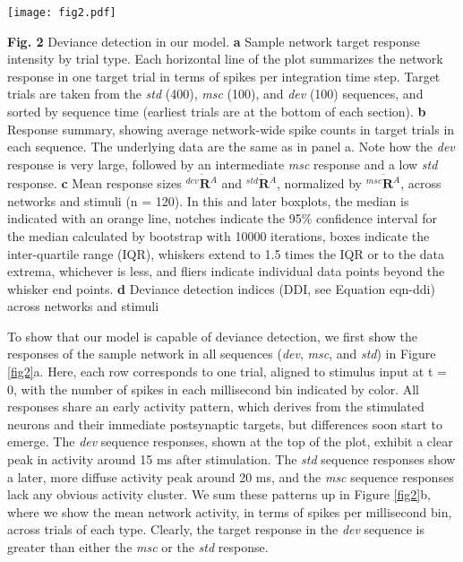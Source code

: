\documentclass[pdflatex,referee,iicol,sn-basic]{sn-jnl}
\newcommand{\dev}{\textit{dev}}
\newcommand{\msc}{\textit{msc}}
\newcommand{\std}{\textit{std}}
\renewcommand{\R}[3][]{{}^{#1}_{}\mathbf{R}^{#2}_{#3}}
\newcommand{\mean}[1]{\overline{#1}}
\newcommand{\refpanel}[2]{Figure \ref{fig#1}\lowercase{#2}}
\begin{document}
\begin{figure*}%
    \centering
    \texttt{[image: fig2.pdf]}
    \caption{}
    \label{fig2}
\end{figure*}
\textbf{Fig. 2} Deviance detection in our model.
\textbf{a} Sample network target response intensity by trial type. Each horizontal line of the plot summarizes the network response in one target trial in terms of spikes per integration time step. Target trials are taken from the \std{} (400), \msc{} (100), and \dev{} (100) sequences, and sorted by sequence time (earliest trials are at the bottom of each section).
\textbf{b} Response summary, showing average network-wide spike counts in target trials in each sequence. The underlying data are the same as in panel a. Note how the \dev{} response is very large, followed by an intermediate \msc{} response and a low \std{} response.
\textbf{c} Mean response sizes $\mean{\R[dev]{A}{}}$ and $\mean{\R[std]{A}{}}$, normalized by $\mean{\R[msc]{A}{}}$, across networks and stimuli (n = 120). In this and later boxplots, the median is indicated with an orange line, notches indicate the 95\% confidence interval for the median calculated by bootstrap with 10000 iterations, boxes indicate the inter-quartile range (IQR), whiskers extend to 1.5 times the IQR or to the data extrema, whichever is less, and fliers indicate individual data points beyond the whisker end points.
\textbf{d} Deviance detection indices (DDI, see Equation {eqn-ddi}) across networks and stimuli

To show that our model is capable of deviance detection, we first show the responses of the sample network in all sequences (\dev{}, \msc{}, and \std{}) in \refpanel{2}{a}. Here, each row corresponds to one trial, aligned to stimulus input at t = 0, with the number of spikes in each millisecond bin indicated by color. All responses share an early activity pattern, which derives from the stimulated neurons and their immediate postsynaptic targets, but differences soon start to emerge. The \dev{} sequence responses, shown at the top of the plot, exhibit a clear peak in activity around 15 ms after stimulation. The \std{} sequence responses show a later, more diffuse activity peak around 20 ms, and the \msc{} sequence responses lack any obvious activity cluster. We sum these patterns up in \refpanel{2}{b}, where we show the mean network activity, in terms of spikes per millisecond bin, across trials of each type. Clearly, the target response in the \dev{} sequence is greater than either the \msc{} or the \std{} response.
\end{document}
